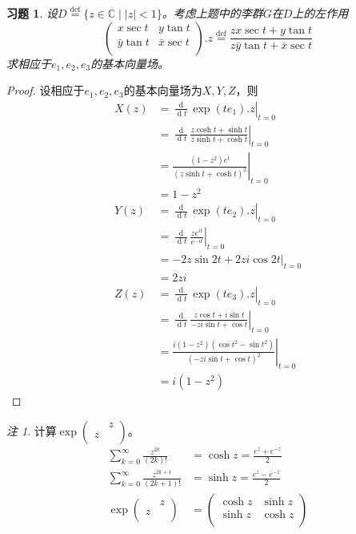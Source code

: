 \documentclass[winfonts,UTF8,c5size,a4paper,fancyhdr,hyperref,titlepage,nocap]{ctexart}
\newtheorem{xiti}{习题}
\theoremstyle{definition}
\theoremstyle{remark}
\newtheorem*{rem}{注}
\numberwithin{equation}{subsection}
\newcommand{\Complex}{\mathbb{C}}
\newcommand{\dt}{\frac{\operatorname{d}}{\operatorname{d}t}}
\newcommand{\local}[2]{\left.{#1}\right|_{#2}}%
\newcommand{\localt}[1]{\local{#1}{t=0}}%
\newcommand{\defeq}{\stackrel{{\mathrm{def}}}{=}}
\begin{document}
\begin{xiti}
  设$D\defeq\{z\in\Complex\mid|z|<1\}$。考虑上题中的李群$G$在$D$上的左作用
  \begin{equation*}
    \begin{pmatrix}
     x\sec t & y\tan t \\
     \bar{y}\tan t & \bar{x}\sec t \\
    \end{pmatrix}.z\defeq
    \frac{zx\sec t+y\tan t}{z\bar{y}\tan t+\bar{x}\sec t}
  \end{equation*}
  求相应于$e_1,e_2,e_3$的基本向量场。
\end{xiti}
\begin{proof}
  设相应于$e_1,e_2,e_3$的基本向量场为$X, Y, Z$，则
  \begin{align*}
    X(z) &=\localt{\dt\exp(te_1).z} \\
     &=\localt{\dt\frac{z\cosh t+\sinh t}{z\sinh t+\cosh t}}\\
     &=\localt{\frac{(1-z^2)e^t}{(z\sinh t+\cosh t)^2}}\\
     &=1-z^2\\
    Y(z) &=\localt{\dt\exp(te_2).z} \\
     &=\localt{\dt\frac{ze^{it}}{e^{-it}}}\\
     &=\localt{-2z\sin 2t+2zi\cos 2t}\\
     &=2zi\\
    Z(z) &=\localt{\dt\exp(te_3).z} \\
     &=\localt{\dt\frac{z\cos t+i\sin t}{-zi\sin t+\cos t}}\\
     &=\localt{\frac{i(1-z^2)(\cos t^2-\sin t^2)}{(-zi\sin t+\cos t)^2}}\\
     &=i(1-z^2)
  \end{align*}
\end{proof}

\begin{rem}
  计算$\exp\begin{pmatrix}
            & z \\
           z &  \\
         \end{pmatrix}$。
  \begin{align*}
    \sum_{k=0}^{\infty}\frac{z^{2k}}{(2k)!}&=\cosh z=\frac{e^z+e^{-z}}{2} \\
    \sum_{k=0}^{\infty}\frac{z^{2k+1}}{(2k+1)!}&=\sinh z=\frac{e^z-e^{-z}}{2}\\
    \exp\begin{pmatrix}
            & z \\
           z &  \\
         \end{pmatrix}
         &=\begin{pmatrix}
            \cosh z & \sinh z \\
            \sinh z & \cosh z \\
          \end{pmatrix}
  \end{align*}
\end{rem}

\newpage
{}
{}
\printindex
\end{document}

